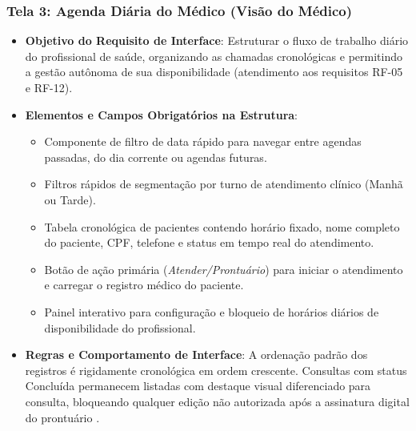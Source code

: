 \subsubsection{Tela 3: Agenda Diária do Médico (Visão do Médico)}
\begin{itemize}
    \item \textbf{Objetivo do Requisito de Interface}: Estruturar o fluxo de trabalho diário do profissional de saúde, organizando as chamadas cronológicas e permitindo a gestão autônoma de sua disponibilidade (atendimento aos requisitos RF-05 e RF-12).
    \item \textbf{Elementos e Campos Obrigatórios na Estrutura}:
    \begin{itemize}
        \item Componente de filtro de data rápido para navegar entre agendas passadas, do dia corrente ou agendas futuras.
        \item Filtros rápidos de segmentação por turno de atendimento clínico (Manhã ou Tarde).
        \item Tabela cronológica de pacientes contendo horário fixado, nome completo do paciente, CPF, telefone e status em tempo real do atendimento.
        \item Botão de ação primária (\textit{Atender/Prontuário}) para iniciar o atendimento e carregar o registro médico do paciente.
        \item Painel interativo para configuração e bloqueio de horários diários de disponibilidade do profissional.
    \end{itemize}
    \item \textbf{Regras e Comportamento de Interface}: A ordenação padrão dos registros é rigidamente cronológica em ordem crescente. Consultas com status Concluída permanecem listadas com destaque visual diferenciado para consulta, bloqueando qualquer edição não autorizada após a assinatura digital do prontuário \cite{shneiderman2016}.
\end{itemize}

